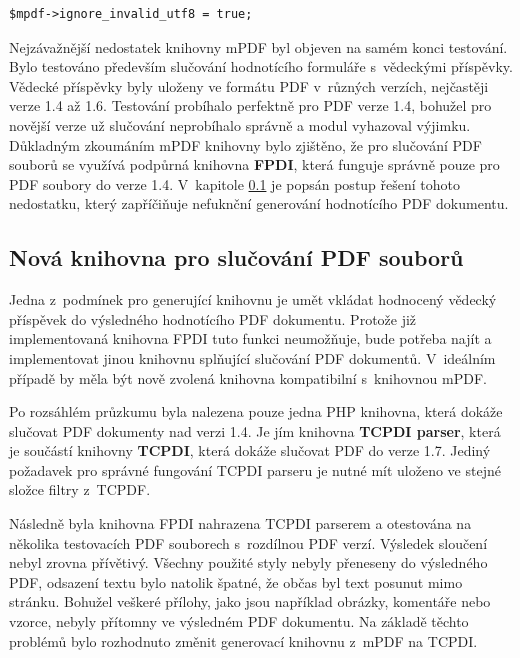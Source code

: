 \begin{lstlisting}[caption = {Nastavení atributu \textbf{ignore\_invalid\_utf8} (orlib.php)}, label = {lst:ignore_invalid_utf8}, captionpos=b]
$mpdf->ignore_invalid_utf8 = true;
\end{lstlisting}
\par
Nejzávažnější nedostatek knihovny mPDF byl objeven na samém konci testování. Bylo testováno především slučování hodnotícího formuláře s~vědeckými příspěvky. Vědecké příspěvky byly uloženy ve formátu PDF v~různých verzích, nejčastěji verze 1.4 až 1.6. Testování probíhalo perfektně pro PDF verze 1.4, bohužel pro novější verze už slučování neprobíhalo správně a modul vyhazoval výjimku. Důkladným zkoumáním mPDF knihovny bylo zjištěno, že pro slučování PDF souborů se využívá podpůrná knihovna \textbf{FPDI}, která funguje správně pouze pro PDF soubory do verze 1.4. V~kapitole \ref{subsec:nova_PDF_merge_knihovna} je popsán postup řešení tohoto nedostatku, který zapříčiňuje nefuknční generování hodnotícího PDF dokumentu.

\subsection{Nová knihovna pro slučování PDF souborů}
\label{subsec:nova_PDF_merge_knihovna}
Jedna z~podmínek pro generující knihovnu je umět vkládat hodnocený vědecký příspěvek do výsledného hodnotícího PDF dokumentu. Protože již implementovaná knihovna FPDI tuto funkci neumožňuje, bude potřeba najít a implementovat jinou knihovnu splňující slučování PDF dokumentů. V~ideálním případě by měla být nově zvolená knihovna kompatibilní s~knihovnou mPDF.
\par
Po rozsáhlém průzkumu byla nalezena pouze jedna PHP knihovna, která dokáže slučovat PDF dokumenty nad verzi 1.4. Je jím knihovna \textbf{TCPDI parser}, která je součástí knihovny \textbf{TCPDI}, která dokáže slučovat PDF do verze 1.7. Jediný požadavek pro správné fungování TCPDI parseru je nutné mít uloženo ve stejné složce filtry z~TCPDF.
\par
Následně byla knihovna FPDI nahrazena TCPDI parserem a otestována na několika testovacích PDF souborech s~rozdílnou PDF verzí. Výsledek sloučení nebyl zrovna přívětivý. Všechny použité styly nebyly přeneseny do výsledného PDF, odsazení textu bylo natolik špatné, že občas byl text posunut mimo stránku.  Bohužel veškeré přílohy, jako jsou například obrázky, komentáře nebo vzorce, nebyly přítomny ve výsledném PDF dokumentu. Na základě těchto problémů bylo rozhodnuto změnit generovací knihovnu z~mPDF na TCPDI.

